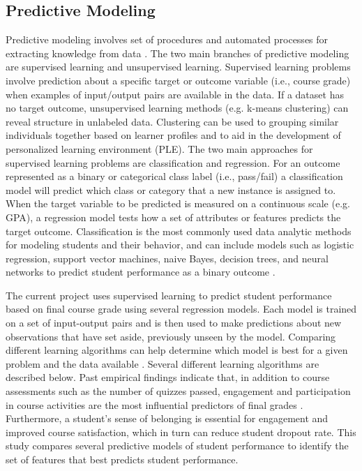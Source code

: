 \documentclass[sigconf]{acmart}
\begin{document}

\subsection{Predictive Modeling}

Predictive modeling involves set of procedures and automated processes for 
extracting knowledge from data \cite{james13, kuhn13}. The two main branches 
of predictive modeling are supervised learning and unsupervised learning. 
Supervised learning problems involve prediction about a specific target or 
outcome variable (i.e., course grade) when examples of input/output pairs 
are available in the data. If a dataset has no target outcome, unsupervised
learning methods (e.g. k-means clustering) can reveal structure in unlabeled 
data. Clustering can be used to grouping similar individuals together based 
on learner profiles and to aid in the development of personalized learning 
environment (PLE)\cite{Vellido10}. The two main approaches for supervised 
learning problems are classification and regression. For an outcome represented 
as a binary or categorical class label (i.e., pass/fail) a classification model 
will predict which class or category that a new instance is assigned to. When 
the target variable to be predicted is measured on a continuous scale (e.g. 
GPA), a regression model tests how a set of attributes or features predicts 
the target outcome. Classification is the most commonly used data analytic 
methods for modeling students and their behavior, and can include models 
such as logistic regression, support vector machines, naive Bayes, decision 
trees, and neural networks to predict student performance as a binary outcome 
\cite{Lykourentzou09}. 


The current project uses supervised learning to predict student performance 
based on final course grade using several regression models. Each model is 
trained on a set of input-output pairs and is then used to make predictions 
about new observations that have set aside, previously unseen by the model. 
Comparing different learning algorithms can help determine which model is best 
for a given problem and the data available \cite{raschka17}. Several different 
learning algorithms are described below. Past empirical findings indicate 
that, in addition to course assessments such as the number of quizzes passed, 
engagement and participation in course activities are the most influential 
predictors of final grades \cite{Papamitsiou14, romerozaldivar12}. Furthermore, 
a student's sense of belonging is essential for engagement and improved 
course satisfaction, which in turn can reduce student dropout rate. This study 
compares several predictive models of student performance to identify 
the set of features that best predicts student performance. 
\end{document}
